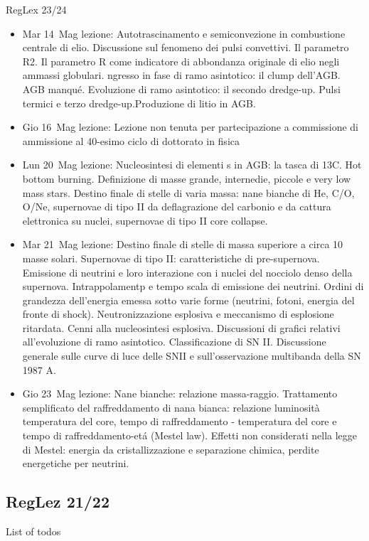 \begin{frame}[allowframebreaks]{RegLex 23/24}
\begin{itemize}
\item Mar 14 Mag lezione: Autotrascinamento e semiconvezione in combustione centrale di elio. Discussione sul fenomeno dei pulsi convettivi. Il parametro R2. Il parametro R come indicatore di abbondanza originale di elio negli ammassi globulari. ngresso in fase di ramo asintotico: il clump dell'AGB. AGB manqu\'e. Evoluzione di ramo asintotico: il secondo dredge-up. Pulsi termici e terzo dredge-up.Produzione di litio in AGB. 
\item Gio 16 Mag lezione: Lezione non tenuta per partecipazione a commissione di ammissione al 40-esimo ciclo di dottorato in fisica 
\item Lun 20 Mag lezione: Nucleosintesi di elementi s in AGB: la tasca di 13C. Hot bottom burning. Definizione di masse grande, internedie, piccole e very low mass stars. Destino finale di stelle di varia massa: nane bianche di He, C/O, O/Ne, supernovae di tipo II da deflagrazione del carbonio e da cattura elettronica su nuclei, supernovae di tipo II core collapse. 
\item Mar 21 Mag lezione: Destino finale di stelle di massa superiore a circa 10 masse solari. Supernovae di tipo II: caratteristiche di pre-supernova. Emissione di neutrini e loro interazione con i nuclei del nocciolo denso della supernova. Intrappolamentp e tempo scala di emissione dei neutrini. Ordini di grandezza dell'energia emessa sotto varie forme (neutrini, fotoni, energia del fronte di shock). Neutronizzazione esplosiva e meccanismo di esplosione ritardata. Cenni alla nucleosintesi esplosiva. Discussioni di grafici relativi all'evoluzione di ramo asintotico. Classificazione di SN II. Discussione generale sulle curve di luce delle SNII e sull'osservazione multibanda della SN 1987 A. 
\item Gio 23 Mag lezione: Nane bianche: relazione massa-raggio. Trattamento semplificato del raffreddamento di nana bianca: relazione luminosità temperatura del core, tempo di raffreddamento - temperatura del core e tempo di raffreddamento-et\'a (Mestel law). Effetti non considerati nella legge di Mestel: energia da cristallizzazione e separazione chimica, perdite energetiche per neutrini. 
\end{itemize}
\end{frame}
\subsection{RegLez 21/22}

\begin{frame}[allowframebreaks]{List of todos}
\end{frame}

